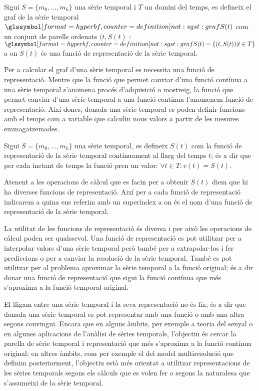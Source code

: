 \begin{definition}%
  Sigui $S=\{m_0,\ldots,m_k\}$ una sèrie temporal i $T$ un domini del
  temps, es defineix el graf de la sèrie temporal
  $\glssymboldef{not:sgst:graf} S(t)$ com un conjunt de parells
  ordenats $(t,S(t)$ : $\glssymboldef{not:sgst:graf} S(t) = \{ (t,S(t)) |
  t\in T \}$ a on $S(t)$ és una funció de representació de la sèrie
  temporal.
\end{definition}

Per a calcular el graf d'una sèrie temporal es necessita una funció de
representació. Mentre que la funció que permet canviar d'una funció
contínua a una sèrie temporal s'anomena procés d'adquisició o
mostreig, la funció que permet canviar d'una sèrie temporal a una
funció contínua l'anomenem funció de representació.  Així doncs,
donada una sèrie temporal es poden definir funcions amb el temps com a
variable que calculin nous valors a partir de les mesures
emmagatzemades.
\begin{definition}
  Sigui $S=\{m_0,\ldots,m_k\}$ una sèrie temporal, es defineix $S(t)$
  com la funció de representació de la sèrie temporal contínuament al
  llarg del temps $t$; és a dir que per cada instant de temps la
  funció pren un valor: $\forall t\in T: v(t) = S(t)$. 

  Atenent a les operacions de càlcul que es facin per a obtenir $S(t)$
  diem que hi ha diverses funcions de representació. Així per a cada
  funció de representació indicarem a quina ens referim amb un
  superíndex  a on
   és el nom d'una funció de representació
  de la sèrie temporal.
\end{definition}

La utilitat de les funcions de representació és diversa i per això les
operacions de càlcul poden ser qualssevol. Una funció de representació
es pot utilitzar per a interpolar valors d'una sèrie temporal però
també per a extrapolar-los i fer prediccions o per a canviar la
resolució de la sèrie temporal. També es pot utilitzar per al problema
aproximar la sèrie temporal a la funció original; és a dir donar una
funció de representació que sigui la funció contínua que més
s'aproxima a la funció temporal original.


El lligam entre una sèrie temporal i la seva representació no és fix;
és a dir que donada una sèrie temporal es pot representar amb una
funció o amb una altra segons convingui.  Encara que en alguns àmbits,
per exemple a teoria del senyal o en algunes aplicacions de l'anàlisi
de sèries temporals, l'objectiu és cercar la parella de sèrie temporal
i representació que més s'aproxima a la funció contínua original; en
altres àmbits, com per exemple el del model multiresolució que definim
posteriorment, l'objectiu està més orientat a utilitzar
representacions de les sèries temporals segons els càlculs que es
volen fer o segons la naturalesa que s'assumeixi de la sèrie temporal.


